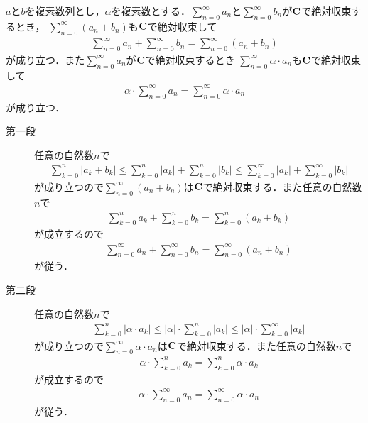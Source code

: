 	\begin{screen}
		\begin{thm}[絶対収束する級数の線型性]
		\label{thm:linearity_of_absolutely_convergent_series}
			$a$と$b$を複素数列とし，$\alpha$を複素数とする．$\sum_{n=0}^\infty a_n$と$\sum_{n=0}^\infty b_n$が$\mathbf{C}$で絶対収束するとき，
			$\sum_{n=0}^\infty (a_n + b_n)$も$\mathbf{C}$で絶対収束して
			\begin{align}
				\sum_{n=0}^\infty a_n + \sum_{n=0}^\infty b_n = \sum_{n=0}^\infty (a_n + b_n)
			\end{align}
			が成り立つ．また$\sum_{n=0}^\infty a_n$が$\mathbf{C}$で絶対収束するとき
			$\sum_{n=0}^\infty \alpha \cdot a_n$も$\mathbf{C}$で絶対収束して
			\begin{align}
				\alpha \cdot \sum_{n=0}^\infty a_n = \sum_{n=0}^\infty \alpha \cdot a_n
			\end{align}
			が成り立つ．
		\end{thm}
	\end{screen}
	
	\begin{sketch}\mbox{}
		\begin{description}
			\item[第一段] 任意の自然数$n$で
				\begin{align}
					\sum_{k=0}^n |a_k + b_k| \leq \sum_{k=0}^n |a_k| + \sum_{k=0}^n |b_k| 
					\leq \sum_{k=0}^\infty |a_k| + \sum_{k=0}^\infty |b_k|
				\end{align}
				が成り立つので$\sum_{n=0}^\infty (a_n + b_n)$は$\mathbf{C}$で絶対収束する．また任意の自然数$n$で
				\begin{align}
					\sum_{k=0}^n a_k + \sum_{k=0}^n b_k = \sum_{k=0}^n (a_k + b_k)
				\end{align}
				が成立するので
				\begin{align}
					\sum_{n=0}^\infty a_n + \sum_{n=0}^\infty b_n = \sum_{n=0}^\infty (a_n + b_n)
				\end{align}
				が従う．
			
			\item[第二段] 任意の自然数$n$で
				\begin{align}
					\sum_{k=0}^n |\alpha \cdot a_k| \leq |\alpha| \cdot \sum_{k=0}^n |a_k| 
					\leq |\alpha| \cdot \sum_{k=0}^\infty |a_k| 
				\end{align}
				が成り立つので$\sum_{n=0}^\infty \alpha \cdot a_n$は$\mathbf{C}$で絶対収束する．また任意の自然数$n$で
				\begin{align}
					\alpha \cdot \sum_{k=0}^n a_k = \sum_{k=0}^n \alpha \cdot a_k
				\end{align}
				が成立するので
				\begin{align}
					\alpha \cdot \sum_{n=0}^\infty a_n = \sum_{n=0}^\infty \alpha \cdot a_n
				\end{align}
				が従う．
				\QED
		\end{description}
	\end{sketch}
	
